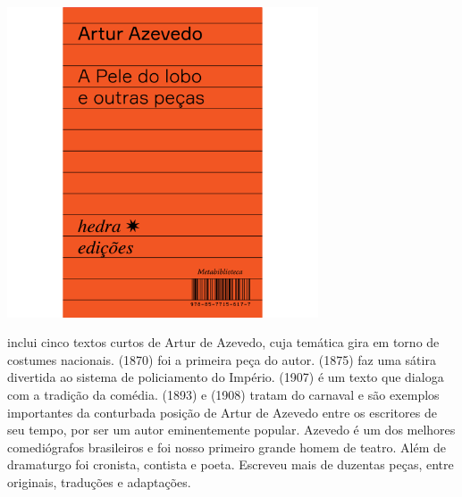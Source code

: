 \vfill

\hspace*{-.4cm}\begin{minipage}[c]{.5\linewidth}
\small{
{}}
\end{minipage}

\pagebreak

\begin{center}
\hspace*{.5cm}\includegraphics[width=92mm]{./grid/azevedo.jpg}
\end{center}

\hspace*{-7cm}\hrulefill\hspace*{-7cm}

\medskip

 inclui cinco textos curtos de Artur de Azevedo, cuja temática gira em torno de costumes nacionais. {} (1870) foi a primeira peça do autor. {} (1875) faz uma sátira divertida ao sistema de policiamento do Império. {} (1907) é um texto que dialoga com a tradição da comédia. {} (1893) e {} (1908) tratam do carnaval e são exemplos importantes da conturbada posição de Artur de Azevedo entre os escritores de seu tempo, por ser um autor eminentemente popular. Azevedo é um dos melhores comediógrafos brasileiros e foi nosso primeiro grande homem de teatro. Além de dramaturgo foi cronista, contista e poeta. Escreveu mais de duzentas peças, entre originais, traduções e adaptações.


